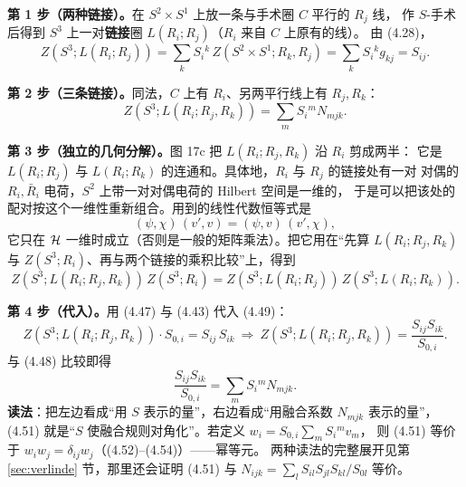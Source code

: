 \begin{derivation}[D8.5：(4.51) 的完整推导]
\textbf{第 1 步（两种链接）。}在 $S^2\times S^1$ 上放一条与手术圈 $C$ 平行的 $R_j$ 线，
作 $S$-手术后得到 $S^3$ 上一对\textbf{链接}圈 $L(R_i;R_j)$（$R_i$ 来自 $C$ 上原有的线）。
由 (4.28)，
\begin{equation}
Z(S^3;L(R_i;R_j))=\sum_kS_i{}^k\,Z(S^2\times S^1;R_k,R_j)=\sum_kS_i{}^kg_{kj}=S_{ij}.
\tag{4.47}
\end{equation}

\textbf{第 2 步（三条链接）。}同法，$C$ 上有 $R_i$、另两平行线上有 $R_j,R_k$：
\begin{equation}
Z(S^3;L(R_i;R_j,R_k))=\sum_mS_i{}^mN_{mjk}.
\tag{4.48}
\end{equation}

\textbf{第 3 步（独立的几何分解）。}图 17c 把 $L(R_i;R_j,R_k)$ 沿 $R_i$ 剪成两半：
它是 $L(R_i;R_j)$ 与 $L(R_i;R_k)$ 的连通和。具体地，$R_i$ 与 $R_j$ 的链接处有一对
对偶的 $R_i,\bar R_i$ 电荷，$S^2$ 上带一对对偶电荷的 Hilbert 空间是一维的，
于是可以把该处的配对按这个一维性重新组合。用到的线性代数恒等式是
\begin{equation}
(\psi,\chi)\,(v',v)=(\psi,v)\,(v',\chi),
\end{equation}
它只在 $\mathcal{H}$ 一维时成立（否则是一般的矩阵乘法）。把它用在“先算 $L(R_i;R_j,R_k)$ 与
$Z(S^3;R_i)$、再与两个链接的乘积比较”上，得到
\begin{equation}
Z(S^3;L(R_i;R_j,R_k))\,Z(S^3;R_i)
=Z(S^3;L(R_i;R_j))\,Z(S^3;L(R_i;R_k)).
\tag{4.49}
\end{equation}

\textbf{第 4 步（代入）。}用 (4.47) 与 (4.43) 代入 (4.49)：
\[
Z(S^3;L(R_i;R_j,R_k))\cdot S_{0,i}=S_{ij}\,S_{ik}
\ \Longrightarrow\
Z(S^3;L(R_i;R_j,R_k))=\frac{S_{ij}S_{ik}}{S_{0,i}} .
\tag{4.50}
\]
与 (4.48) 比较即得
\begin{equation}
\frac{S_{ij}S_{ik}}{S_{0,i}}=\sum_mS_i{}^mN_{mjk}.
\tag{4.51}
\end{equation}
\textbf{读法}：把左边看成“用 $S$ 表示的量”，右边看成“用融合系数 $N_{mjk}$ 表示的量”，
(4.51) 就是“$S$ 使融合规则对角化”。若定义 $w_i=S_{0,i}\sum_mS_i{}^mv_m$，
则 (4.51) 等价于 $w_iw_j=\delta_{ij}w_j$（(4.52)--(4.54)）——幂等元。
两种读法的完整展开见第 \ref{sec:verlinde} 节，那里还会证明 (4.51) 与
$N_{ijk}=\sum_lS_{il}S_{jl}S_{kl}/S_{0l}$ 等价。\ours
\end{derivation}

